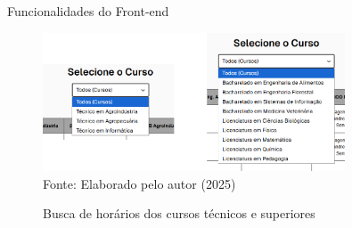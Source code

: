 \begin{frame}{Funcionalidades do Front-end}
    \begin{figure}
        \centering
        \vspace{-0.5cm}
        \caption{Busca de horários dos cursos técnicos e superiores}
        \vspace{-0.2cm}
        \includegraphics[width=0.8\textwidth]{figuras/front-17.png}
        \\ %
        \small Fonte: Elaborado pelo autor (2025)
    \end{figure}
\end{frame}

